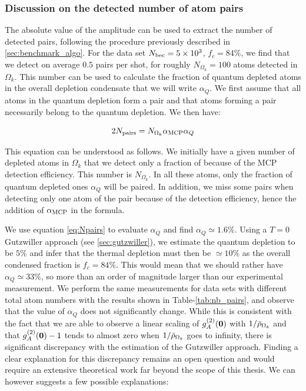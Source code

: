 \subsubsection{Discussion on the detected number of atom pairs}

The absolute value of the amplitude can be used to extract the number of detected \kmk pairs, following the procedure previously described in \ref{sec:benchmark_algo}. For the data set $N_{\rm{bec}}=5 \times 10^3$, $f_c=84 \%$, we find that we detect on average $0.5$ pairs per shot, for roughly $N_{\Omega_k}=100$ atoms detected in $\Omega_k$. This number can be used to calculate the fraction of quantum depleted atoms in the overall depletion condensate that we will write $\alpha_Q$. We first assume that all atoms in the quantum depletion form a \kmk pair and that atoms forming a \kmk pair necessarily belong to the quantum depletion. We then have:

\begin{equation}
    2N_{\rm{pairs}}= N_{\Omega_k} \alpha_{\rm{MCP}} \alpha_Q
    \label{eq:Npairs}
\end{equation}

\noindent This equation can be understood as follows. We initially have a given number of depleted atoms in $\Omega_k$ that we detect only a fraction of because of the MCP detection efficiency. This number is $N_{\Omega_k}$. In all these atoms, only the fraction of quantum depleted ones $\alpha_Q$ will be \kmk paired. In addition, we miss some pairs when detecting only one atom of the pair because of the detection efficiency, hence the addition of $\alpha_{\rm{MCP}}$ in the formula.

We use equation \ref{eq:Npairs} to evaluate $\alpha_Q$ and find $\alpha_Q \simeq 1.6 \%$. Using a $T=0$ Gutzwiller approach (see \ref{sec:gutzwiller}), we estimate the quantum depletion to be $5\%$ and infer that the thermal depletion must then be $\simeq 10\%$ as the overall condensed fraction is $f_c=84 \%$. This would mean that we should rather have $\alpha_Q \simeq 33 \%$, so more than an order of magnitude larger than our experimental measurement. We perform the same measurements for data sets with different total atom numbers with the results shown in Table-\ref{tab:nb_pairs}, and observe that the value of $\alpha_Q$ does not significantly change. While this is consistent with the fact that we are able to observe a linear scaling of $g^{(2)}_A (\bm{0})$ with $1/\bar{\rho}_{\Omega_k}$ and that $g^{(2)}_A (\bm{0})-1$ tends to almost zero when $1/\bar{\rho}_{\Omega_k}$ goes to infinity, there is significant discrepancy with the estimation of the Gutzwiller approach. Finding a clear explanation for this discrepancy remains an open question and would require an extensive theoretical work far beyond the scope of this thesis. We can however suggests a few possible explanations:

